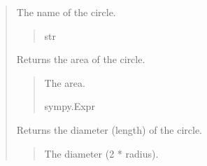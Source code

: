 \documentclass[letterpaper,10pt,english]{sphinxmanual}
\begin{document}
\begin{quote}
\begin{fulllineitems}
\begin{fulllineitems}
\begin{quote}
\begin{description}
\end{description}\end{quote}

\end{fulllineitems}


\begin{fulllineitems}
\label{\detokenize{pygeox:pygeox.basic_objects.Circle.name}}
\pysigstartsignatures
\pysigline
{}
\pysigstopsignatures
\sphinxAtStartPar
The name of the circle.
\begin{quote}\begin{description}
\sphinxAtStartPar
str

\end{description}\end{quote}

\end{fulllineitems}


\begin{fulllineitems}
\label{\detokenize{pygeox:pygeox.basic_objects.Circle.area}}
\pysigstartsignatures
\pysigline
{}
\pysigstopsignatures
\sphinxAtStartPar
Returns the area of the circle.
\begin{quote}\begin{description}
\sphinxAtStartPar
The area.

\sphinxAtStartPar
sympy.Expr

\end{description}\end{quote}

\end{fulllineitems}


\begin{fulllineitems}
\label{\detokenize{pygeox:pygeox.basic_objects.Circle.diameter}}
\pysigstartsignatures
\pysigline
{}
\pysigstopsignatures
\sphinxAtStartPar
Returns the diameter (length) of the circle.
\begin{quote}\begin{description}
\sphinxAtStartPar
The diameter (2 * radius).


\end{description}
\end{quote}
\end{fulllineitems}
\end{fulllineitems}
\end{quote}
\end{document}
